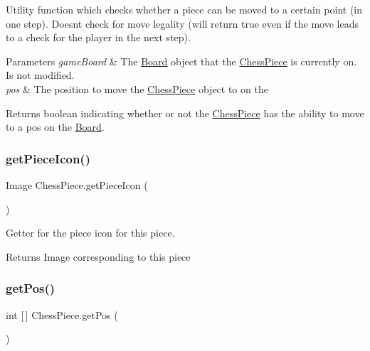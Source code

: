 Utility function which checks whether a piece can be moved to a certain point (in one step). Doesn\textquotesingle{}t check for move legality (will return true even if the move leads to a check for the player in the next step). 
\begin{DoxyParams}{Parameters}
{\em game\+Board} & The \mbox{\hyperlink{class_board}{Board}} object that the \mbox{\hyperlink{class_chess_piece}{Chess\+Piece}} is currently on. Is not modified. \\
\hline
{\em pos} & The position to move the \mbox{\hyperlink{class_chess_piece}{Chess\+Piece}} object to on the \\
\hline
\end{DoxyParams}
\begin{DoxyReturn}{Returns}
boolean indicating whether or not the \mbox{\hyperlink{class_chess_piece}{Chess\+Piece}} has the ability to move to a \textquotesingle{}pos\textquotesingle{} on the \mbox{\hyperlink{class_board}{Board}}. 
\end{DoxyReturn}
\mbox{\label{class_chess_piece_a13507c93ebbf4808935a49a9a102323b}} 
\subsubsection{\texorpdfstring{get\+Piece\+Icon()}{getPieceIcon()}}
{\footnotesize\ttfamily Image Chess\+Piece.\+get\+Piece\+Icon (\begin{DoxyParamCaption}{ }\end{DoxyParamCaption})}

Getter for the piece icon for this piece. \begin{DoxyReturn}{Returns}
Image corresponding to this piece 
\end{DoxyReturn}
\mbox{\label{class_chess_piece_a1d244aeaf799afb923173d055fb5bb6b}} 
\subsubsection{\texorpdfstring{get\+Pos()}{getPos()}}
{\footnotesize\ttfamily int \mbox{[}$\,$\mbox{]} Chess\+Piece.\+get\+Pos (\begin{DoxyParamCaption}{ }\end{DoxyParamCaption})}


